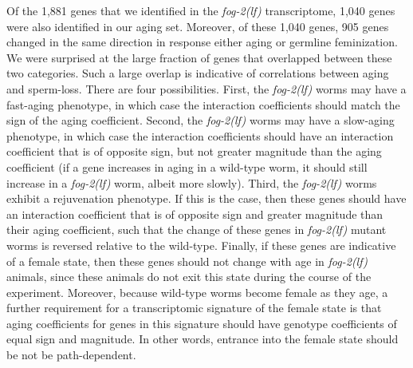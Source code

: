 \documentclass[10pt,letterpaper,twocolumn]{article}
\newcommand{\fog}{\emph{\mbox{fog-2(lf)}}}
\newcommand{\fogn}{1,881}
\newcommand{\coexpressed}{905}
\newcommand{\intersectn}{1,040}
\begin{document}
Of the \fogn{} genes that we identified in the \fog{}
transcriptome, \intersectn{} genes were also identified in our aging set.
Moreover, of these \intersectn{}  genes, \coexpressed{} genes changed in the
same direction in response either aging or germline feminization.
We were surprised at the large fraction of genes that overlapped between these
two categories. Such a large overlap is indicative of correlations between aging
and sperm-loss. There are four possibilities. First, the \fog{} worms may
have a fast-aging phenotype, in which case the interaction coefficients should
match the sign of the aging coefficient. Second, the \fog{} worms may
have a slow-aging phenotype, in which case the interaction coefficients should
have an interaction coefficient that is of opposite sign, but not greater
magnitude than the aging coefficient (if a gene increases in aging in a
wild-type worm, it should still increase in a \fog{} worm, albeit more slowly).
Third, the \fog{} worms exhibit a rejuvenation phenotype. If this is the case,
then these genes should have an interaction coefficient that is of opposite sign
and greater magnitude than their aging coefficient, such that the change of
these genes in \fog{} mutant worms is reversed relative to the wild-type.
Finally, if these genes are indicative of a female state, then these genes
should not change with age in \fog{} animals, since these animals do not exit
this state during the course of the experiment. Moreover, because wild-type
worms become female as they age, a further requirement for a transcriptomic
signature of the female state is that aging coefficients for genes in this
signature should have genotype coefficients of equal sign and magnitude. In
other words, entrance into the female state should be not be path-dependent.
\end{document}
